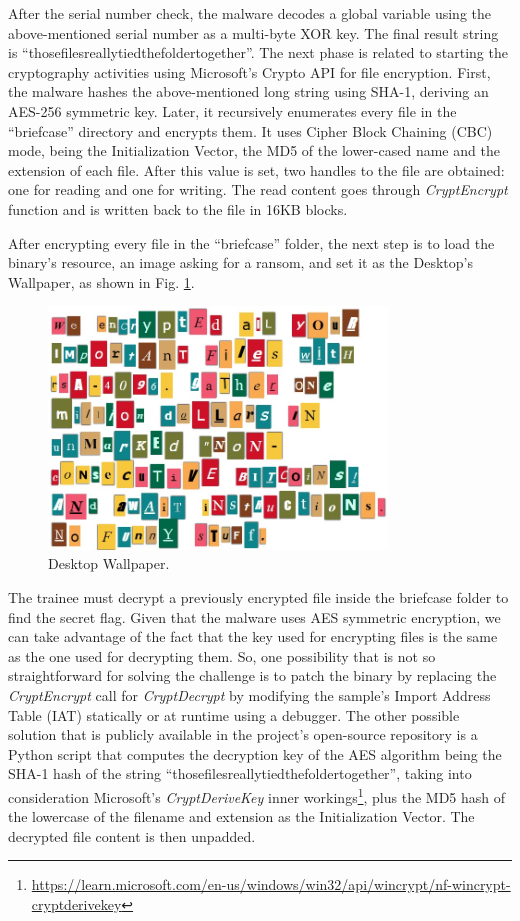 After the serial number check, the malware decodes a global variable using the above-mentioned serial number as a multi-byte XOR key. The final result string is ``thosefilesreallytiedthefoldertogether''. The next phase is related to starting the cryptography activities using Microsoft's Crypto API for file encryption. First, the malware hashes the above-mentioned long string using SHA-1, deriving an AES-256 symmetric key. Later, it recursively enumerates every file in the ``briefcase'' directory and encrypts them. It uses Cipher Block Chaining (CBC) mode, being the Initialization Vector, the MD5 of the lower-cased name and the extension of each file. After this value is set, two handles to the file are obtained: one for reading and one for writing. The read content goes through \textit{CryptEncrypt} function and is written back to the file in 16KB blocks.

After encrypting every file in the ``briefcase'' folder, the next step is to load the binary's resource, an image asking for a ransom, and set it as the Desktop's Wallpaper, as shown in Fig. \ref{fig:ida_5}.

\begin{figure}[H]
    \includegraphics[width=9cm]{figures/ida_5.png}
    \caption{Desktop Wallpaper.}
    \label{fig:ida_5}
\end{figure}

The trainee must decrypt a previously encrypted file inside the briefcase folder to find the secret flag. Given that the malware uses AES symmetric encryption, we can take advantage of the fact that the key used for encrypting files is the same as the one used for decrypting them. So, one possibility that is not so straightforward for solving the challenge is to patch the binary by replacing the \textit{CryptEncrypt} call for \textit{CryptDecrypt} by modifying the sample's Import Address Table (IAT) statically or at runtime using a debugger. The other possible solution that is publicly available in the project's open-source repository is a Python script that computes the decryption key of the AES algorithm being the SHA-1 hash of the string ``thosefilesreallytiedthefoldertogether'', taking into consideration Microsoft's \textit{CryptDeriveKey} inner workings\footnote{\url{https://learn.microsoft.com/en-us/windows/win32/api/wincrypt/nf-wincrypt-cryptderivekey}}, plus the MD5 hash of the lowercase of the filename and extension as the Initialization Vector. The decrypted file content is then unpadded.

